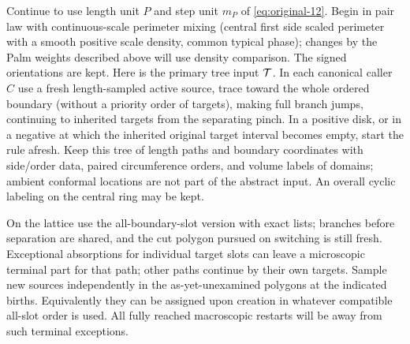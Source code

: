 \begin{definition}\label{kern:primary-input}

Continue to use length unit \(P\) and step unit \(m_P\) of \eqref{eq:original-12}. Begin in pair law with
continuous-scale perimeter mixing (central first side scaled perimeter with a smooth positive scale density,
common typical phase); changes by the Palm weights described above will use density comparison. The signed
orientations are kept. Here is the primary tree input \({\cal T}\). In each canonical caller \(C\) use a
fresh length-sampled active source, trace toward the whole ordered boundary (without a priority order of
targets), making full branch jumps, continuing to inherited targets from the separating pinch. In a positive
disk, or in a negative at which the inherited original target interval becomes empty, start the rule afresh.
Keep this tree of length paths and boundary coordinates with side/order data, paired circumference orders,
and volume labels of domains; ambient conformal locations are not part of the abstract input. An overall
cyclic labeling on the central ring may be kept.

On the lattice use the all-boundary-slot version with exact
lists; branches before separation are shared, and the cut polygon pursued on switching is still fresh.
Exceptional absorptions for individual target slots can leave a microscopic terminal part for that path;
other paths continue by their own targets. Sample new sources independently in the as-yet-unexamined
polygons at the indicated births. Equivalently they can be assigned upon creation in whatever compatible
all-slot order is used. All fully reached macroscopic restarts will be away from such terminal exceptions.

\end{definition}

